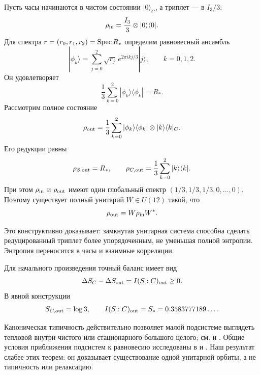 Пусть часы начинаются в чистом состоянии $|0\rangle_C$, а триплет --- в
$I_3/3$:
\begin{equation}
 \rho_{\rm in}=\frac{I_3}{3}\otimes|0\rangle\langle0|.
 \label{eq:v6-entropy-transfer-initial-state}
\end{equation}
Для спектра $r=(r_0,r_1,r_2)=\operatorname{Spec} R_*$ определим равновесный ансамбль
\begin{equation}
 |\phi_k\rangle
 =\sum_{j=0}^2\sqrt{r_j}\,e^{2\pi i kj/3}|j\rangle,
 \qquad k=0,1,2.
\end{equation}
Он удовлетворяет
\begin{equation}
 \frac13\sum_{k=0}^2|\phi_k\rangle\langle\phi_k|=R_*.
\end{equation}
Рассмотрим полное состояние
\begin{equation}
 \rho_{\rm out}=\frac13\sum_{k=0}^2
 |\phi_k\rangle\langle\phi_k|\otimes|k\rangle\langle k|_C.
 \label{eq:v6-entropy-transfer-target-state}
\end{equation}
Его редукции равны
\begin{equation}
 \rho_{S,\rm out}=R_*,
 \qquad
 \rho_{C,\rm out}=\frac13\sum_{k=0}^2|k\rangle\langle k|.
\end{equation}
При этом $\rho_{\rm in}$ и $\rho_{\rm out}$ имеют один глобальный спектр
$(1/3,1/3,1/3,0,\ldots,0)$. Поэтому существует полный унитарий
$W\in U(12)$ такой, что
\begin{equation}
 \rho_{\rm out}=W\rho_{\rm in}W^*.
\end{equation}

Это конструктивно доказывает: замкнутая унитарная система способна сделать
редуцированный триплет более упорядоченным, не уменьшая полной энтропии.
Энтропия переносится в часы и взаимные корреляции.

Для начального произведения точный баланс имеет вид
\begin{equation}
 \Delta S_C-\Delta S_{\rm out}=I(S:C)_{\rm out}\geq0.
 \label{eq:v6-subsystem-entropy-balance}
\end{equation}
В явной конструкции
\begin{equation}
 S_{C,\rm out}=\log3,
 \qquad
 I(S:C)_{\rm out}=S_*=0.3583777189\ldots.
\end{equation}

Каноническая типичность действительно позволяет малой подсистеме выглядеть
тепловой внутри чистого или стационарного большого целого; см.
 и .
Общие условия приближения подсистем к равновесию исследованы в
 и .
Наш результат слабее этих теорем: он доказывает существование одной
унитарной орбиты, а не типичность или релаксацию.

